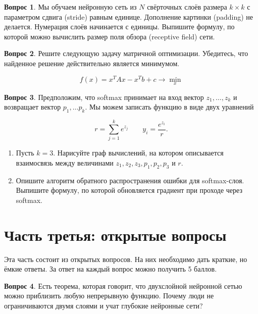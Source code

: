 \documentclass[12pt]{article}
\theoremstyle{definition}
\newtheorem{question}{Вопрос}
\begin{document}
\vspace{8cm} 

\begin{question}
Мы обучаем нейронную сеть из $N$ свёрточных слоёв размера $k \times k$ с параметром сдвига (stride) равным единице. Дополнение картинки (padding) не делается. Нумерация слоёв начинается с единицы. Выпишите формулу, по которой можно вычислить размер поля обзора (receptive field) сети.
\end{question}


\newpage 

\begin{question}
Решите следующую задачу матричной оптимизации. Убедитесь, что найденное решение действительно является минимумом. 

\[
f(x) = x^T A x - x^Tb + c \to \min_{x}
\]
\end{question}

\vspace{6cm} 

\begin{question}
Предположим, что softmax принимает на вход вектор $z_1, \ldots, z_k$ и возвращает вектор $p_1, \ldots p_k$. Мы можем записать функцию в виде двух уравнений

\[
r = \sum_{j = 1}^k e^{z_j} \qquad y_i = \frac{e^{z_i}}{r}.
\]

\begin{enumerate} 
    \item Пусть $k=3$. Нарисуйте граф вычислений, на котором описывается взаимосвязь между величинами $z_1, z_2, z_3, p_1, p_2, p_3$ и $r$. 
    
    \item Опишите алгоритм обратного распространения ошибки для softmax-слоя. Выпишите формулу, по которой обновляется градиент при проходе через softmax. 
\end{enumerate} 
\end{question}


\newpage 


\section*{Часть третья: открытые вопросы}

Эта часть состоит из открытых вопросов. На них необходимо дать краткие, но ёмкие ответы. За ответ на каждый вопрос можно получить 5 баллов.


\begin{question}
    Есть теорема, которая говорит, что двухслойной нейронной сетью можно приблизить любую непрерывную функцию. Почему люди не ограничиваются двумя слоями и учат глубокие нейронные сети? 
\end{question}
\end{document}
